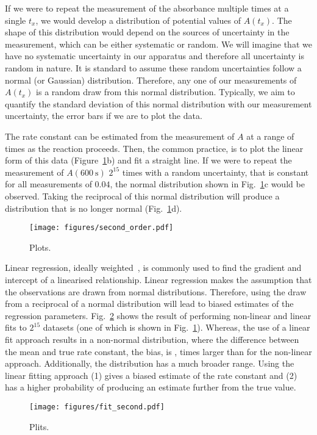 \documentclass[reprint,superscriptaddress,nobibnotes,amsmath,amssymb]{revtex4-2}
\begin{document}
If we were to repeat the measurement of the absorbance multiple times at a single $t_x$, we would develop a distribution of potential values of $A(t_x)$.
The shape of this distribution would depend on the sources of uncertainty in the measurement, which can be either systematic or random. 
We will imagine that we have no systematic uncertainty in our apparatus and therefore all uncertainty is random in nature. 
It is standard to assume these random uncertainties follow a normal (or Gaussian) distribution. 
Therefore, any one of our measurements of $A(t_x)$ is a random draw from this normal distribution.
Typically, we aim to quantify the standard deviation of this normal distribution with our measurement uncertainty, the error bars if we are to plot the data. 

The rate constant can be estimated from the measurement of $A$ at a range of times as the reaction proceeds.
Then, the common practice, is to plot the linear form of this data (Figure~\ref{fig:second_order}b) and fit a straight line. 
If we were to repeat the measurement of $A(\SI{600}{\second})$ $2^{15}$ times with a random uncertainty, that is constant for all measurements of $0.04$, the normal distribution shown in Fig.~\ref{fig:second_order}c would be observed. 
Taking the reciprocal of this normal distribution will produce a distribution that is no longer normal (Fig.~\ref{fig:second_order}d). 
%
\begin{figure}
  \texttt{[image: figures/second\_order.pdf]}
  \caption{
    Plots.
    }
  \label{fig:second_order}
\end{figure}
%

Linear regression, ideally weighted~\cite{perrin_linear_2017}, is commonly used to find the gradient and intercept of a linearised relationship. 
Linear regression makes the assumption that the observations are drawn from normal distributions. 
Therefore, using the draw from a reciprocal of a normal distribution will lead to biased estimates of the regression parameters.
Fig.~\ref{fig:fit_second} shows the result of performing non-linear and linear fits to $2^15$ datasets (one of which is shown in Fig.~\ref{fig:second_order}). 
Whereas, the use of a linear fit approach results in a non-normal distribution, where the difference between the mean and true rate constant, the bias, is ,  times larger than for the non-linear approach. 
Additionally, the distribution has a much broader range.
Using the linear fitting approach (1) gives a biased estimate of the rate constant and (2) has a higher probability of producing an estimate further from the true value. 
%
\begin{figure}
  \texttt{[image: figures/fit\_second.pdf]}
  \caption{
    Plits.
    }
  \label{fig:fit_second}
\end{figure}
%
\end{document}
